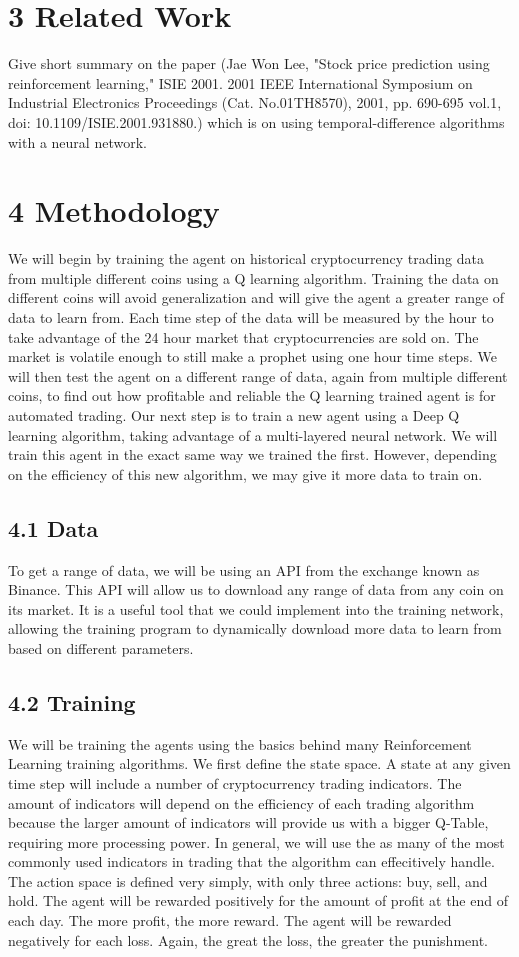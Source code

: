 \documentclass[letterpaper]{article}
\begin{document}
\section{3 Related Work}
Give short summary on the paper (Jae Won Lee, "Stock price prediction using reinforcement learning," ISIE 2001. 2001 IEEE International Symposium on Industrial Electronics Proceedings (Cat. No.01TH8570), 2001, pp. 690-695 vol.1, doi: 10.1109/ISIE.2001.931880.) which is on using temporal-difference algorithms with a neural network.

\section{4 Methodology}
We will begin by training the agent on historical cryptocurrency trading data from multiple different coins using a Q learning algorithm. Training the data on different coins will avoid generalization and will give the agent a greater range of data to learn from. Each time step of the data will be measured by the hour to take advantage of the 24 hour market that cryptocurrencies are sold on. The market is volatile enough to still make a prophet using one hour time steps. We will then test the agent on a different range of data, again from multiple different coins, to find out how profitable and reliable the Q learning trained agent is for automated trading. Our next step is to train a new agent using a Deep Q learning algorithm, taking advantage of a multi-layered neural network. We will train this agent in the exact same way we trained the first. However, depending on the efficiency of this new algorithm, we may give it more data to train on.
\subsection{4.1 Data}
To get a range of data, we will be using an API from the exchange known as Binance. This API will allow us to download any range of data from any coin on its market. It is a useful tool that we could implement into the training network, allowing the training program to dynamically download more data to learn from based on different parameters.
\subsection{4.2 Training}
We will be training the agents using the basics behind many Reinforcement Learning training algorithms. We first define the state space. A state at any given time step will include a number of cryptocurrency trading indicators. The amount of indicators will depend on the efficiency of each trading algorithm because the larger amount of indicators will provide us with a bigger Q-Table, requiring more processing power. In general, we will use the as many of the most commonly used indicators in trading that the algorithm can effecitively handle. The action space is defined very simply, with only three actions: buy, sell, and hold. The agent will be rewarded positively for the amount of profit at the end of each day. The more profit, the more reward. The agent will be rewarded negatively for each loss. Again, the great the loss, the greater the punishment.
\end{document}
